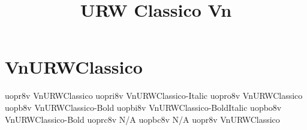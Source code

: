 \documentclass[sample]{vnsample}
\title{URW Classico Vn}
\begin{document}
\section{VnURWClassico}
  {uopr8v}   {VnURWClassico}
 {uopri8v}  {VnURWClassico-Italic}
 {uopro8v}  {VnURWClassico}
  {uopb8v}   {VnURWClassico-Bold}
 {uopbi8v}  {VnURWClassico-BoldItalic}
 {uopbo8v}  {VnURWClassico-Bold}
 {uoprc8v}  {N/A}
 {uopbc8v}  {N/A}
  {uopr8v}   {VnURWClassico}
\end{document}
